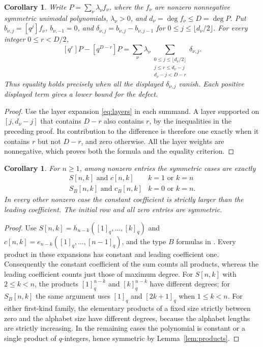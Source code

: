 \documentclass[11pt]{article}
\newtheorem{corollary}[lemma]{Corollary}
\newcommand{\qi}[1]{[#1]_q}
\begin{document}
\begin{corollary}\label{cor:defect}
Write $P=\sum_\nu\lambda_\nu f_\nu$, where the $f_\nu$ are nonzero
nonnegative symmetric unimodal polynomials, $\lambda_\nu>0$, and
$d_\nu=\deg f_\nu\le D=\deg P$.
Put $b_{\nu,j}=[q^j]f_\nu$, $b_{\nu,-1}=0$, and
$\delta_{\nu,j}=b_{\nu,j}-b_{\nu,j-1}$ for
$0\le j\le\lfloor d_\nu/2\rfloor$.
For every integer $0\le r<D/2$,
\begin{equation}\label{eq:defect}
 [q^r]P-[q^{D-r}]P=
 \sum_\nu\lambda_\nu
 \sum_{\substack{0\le j\le\lfloor d_\nu/2\rfloor\\
                  j\le r\le d_\nu-j\\ d_\nu-j<D-r}}
       \delta_{\nu,j}.
\end{equation}
Thus equality holds precisely when all the displayed $\delta_{\nu,j}$
vanish. Each positive displayed term gives a lower bound for the defect.
\end{corollary}
\begin{proof}
Use the layer expansion \eqref{eq:layers} in each summand.
A layer supported on $[j,d_\nu-j]$ that contains $D-r$ also contains
$r$, by the inequalities in the preceding proof. Its contribution to
the difference is therefore one exactly when it contains $r$ but not
$D-r$, and zero otherwise. All the layer weights are nonnegative,
which proves both the formula and the equality criterion.
\end{proof}

\begin{corollary}\label{cor:symmetric}
For $n\ge1$, among nonzero entries the symmetric cases are exactly
\[
\begin{array}{c|c}
 S[n,k]\text{ and }c[n,k]& k=1\text{ or }k=n\\
 S_B[n,k]\text{ and }c_B[n,k]& k=0\text{ or }k=n.
\end{array}
\]
In every other nonzero case the constant coefficient is strictly larger
than the leading coefficient. The initial row and all zero entries are symmetric.
\end{corollary}
\begin{proof}
Use $S[n,k]=h_{n-k}(\qi1,\ldots,\qi k)$ and
$c[n,k]=e_{n-k}(\qi1,\ldots,\qi{n-1})$, and the type $B$
formulas in \cite[Theorem 2.1]{SS}.
Every product in these expansions has constant and leading coefficient one.
Consequently the constant coefficient of the sum counts all products,
whereas the leading coefficient counts just those of maximum degree.
For $S[n,k]$ with $2\le k<n$, the products $\qi1^{n-k}$ and
$\qi k^{n-k}$ have different degrees; for $S_B[n,k]$ the same argument
uses $\qi1$ and $\qi{2k+1}$ when $1\le k<n$.
For either first-kind family, the elementary products of a fixed
size strictly between zero and the alphabet size have different degrees,
because the alphabet lengths are strictly increasing.
In the remaining cases the polynomial is constant or a single product
of $q$-integers, hence symmetric by Lemma~\ref{lem:products}.
\end{proof}
\end{document}
